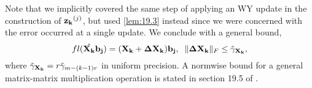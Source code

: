 Note that we implicitly covered the same step of applying an WY update in the construction of $\mathbf{z_k}^{(j)}$, but used \cref{lem:19.3} instead since we were concerned with the error occurred at a single update. 
We conclude with a general bound, 
\begin{equation}\label{eqn:Xkbound}
	fl(\hat{\bb{X_k}}\bb{b_j}) = (\bb{X_k} + \bb{\Delta X_k})\bb{b_j}, \;\; \|\bb{\Delta X_k}\|_F \leq \tilde{\gamma}_{\bb{X_k}},
\end{equation}
where $\tilde{\gamma}_{\mathbf{X_k}} = r\tilde{\gamma}_{m-(k-1)r}$ in uniform precision.
A normwise bound for a general matrix-matrix multiplication operation is stated in section 19.5 of \cite{Higham2002}.

